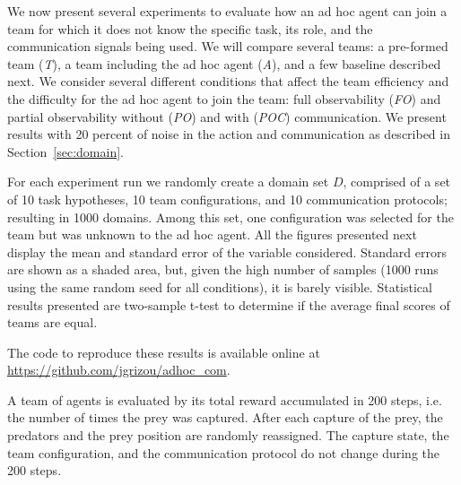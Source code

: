 We now present several experiments to evaluate how an ad hoc agent can join a team for which it does not know the specific task, its role, and the communication signals being used. We will compare several teams: a pre-formed team (\emph{T}), a team including the ad hoc agent (\emph{A}), and a few baseline described next. We consider several different conditions that affect the team efficiency and the difficulty for the ad hoc agent to join the team: full observability (\emph{FO}) and partial observability without (\emph{PO}) and with (\emph{POC}) communication. We present results with 20 percent of noise in the action and communication as described in Section~\ref{sec:domain}.

For each experiment run we randomly create a domain set $D$, comprised of a set of 10 task hypotheses, 10 team configurations, and 10 communication protocols; resulting in 1000 domains. Among this set, one configuration was selected for the team but was unknown to the ad hoc agent. All the figures presented next display the mean and standard error of the variable considered. Standard errors are shown as a shaded area, but, given the high number of samples (1000 runs using the same random seed for all conditions), it is barely visible. Statistical results presented are two-sample t-test to determine if the average final scores of teams are equal.

The code to reproduce these results is available online at \url{https://github.com/jgrizou/adhoc_com}.

A team of agents is evaluated by its total reward accumulated in 200 steps, i.e. the number of times the prey was captured. After each capture of the prey, the predators and the prey position are randomly reassigned. The capture state, the team configuration, and the communication protocol do not change during the 200 steps.



